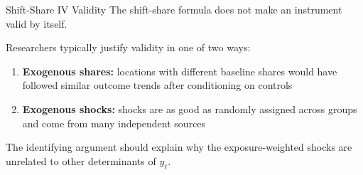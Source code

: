 \documentclass[aspectratio=169,t,11pt,table]{beamer}
\begin{document}
\begin{frame}{Shift-Share IV Validity}
  The shift-share formula does not make an instrument valid by itself.

  \bigskip
  Researchers typically justify validity in one of two ways:
  \begin{enumerate}
    \item \textbf{Exogenous shares:} locations with different baseline shares would have followed similar outcome trends after conditioning on controls

    \medskip
    \item \textbf{Exogenous shocks:} shocks are as good as randomly assigned across groups and come from many independent sources
  \end{enumerate}

  \pause
  \bigskip
  The identifying argument should explain why the exposure-weighted shocks are unrelated to other determinants of $y_\ell$.

\end{frame}
\end{document}
